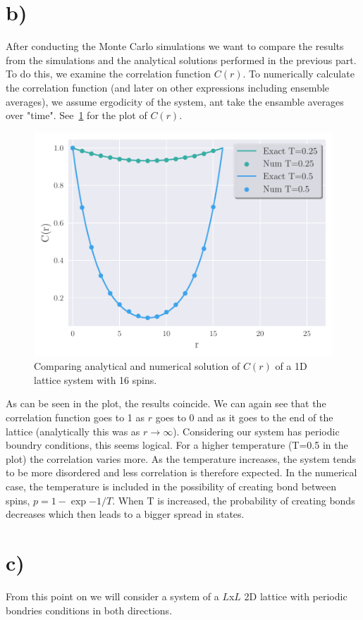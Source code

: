 \section*{b)}
    After conducting the Monte Carlo simulations we want to compare the results from the simulations and the analytical solutions performed in the previous part. To do this, we examine the correlation function $C(r)$. To numerically calculate the correlation function (and later on other expressions including ensemble averages), we assume ergodicity of the system, ant take the ensamble averages over "time". See~\cref{fig:C} for the plot of $C(r)$. 
    \begin{figure}[h]
        \centering
        \includegraphics[width=.49\textwidth]{../figs/plot_b.pdf}
        \caption{Comparing analytical and numerical solution of $C(r)$ of a 1D lattice system with 16 spins.}
        \label{fig:C}
    \end{figure}
   
    As can be seen in the plot, the results coincide. We can again see that the correlation function goes to 1 as $r$ goes to 0 and as it goes to the end of the lattice (analytically this was as $r \rightarrow \infty$). Considering our system has periodic boundry conditions, this seems logical. For a higher temperature (T=0.5 in the plot) the correlation varies more. As the temperature increases, the system tends to be more disordered and less correlation is therefore expected. In the numerical case, the temperature is included in the possibility of creating bond between spins, $p = 1 - \exp{-1/T}$. When T is increased, the probability of creating bonds decreases which then leads to a bigger spread in states.  


\section*{c)}
    From this point on we will consider a system of a $L$x$L$ 2D lattice with periodic bondries conditions in both directions. 
    
